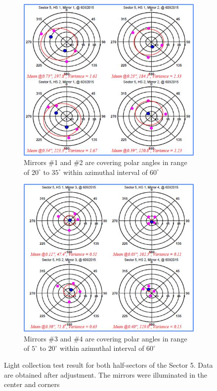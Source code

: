 \begin{figure}
\begin{subfigure}[b]{0.49\textwidth}
    \includegraphics[width=1.0\textwidth]{images/GEO_TEST_Sect5_M_1_M_2.jpg}
    \caption{Mirrors \#1 and \#2 are covering polar angles in range of $20^\circ$ to $35^\circ$  within azimuthal interval of $60^\circ$} \label{fig:subfig1_a}
\end{subfigure}
\hspace*{\fill} %
\begin{subfigure}[b]{0.5\textwidth}
    \includegraphics[width=1.0\linewidth]{images/GEO_TEST_Sect5_M_3_M_4.jpg}
    \caption{Mirrors \#3 and \#4 are covering polar angles in range of $5^\circ$ to $20^\circ$  within azimuthal interval of $60^\circ$} \label{fig:subfig1_b}
\end{subfigure}
\caption{Light collection test result for both half-sectors of the Sector 5. Data are obtained after adjustment. The mirrors were illuminated in the center and corners} 
\label{fig:subfig}
\end{figure}


